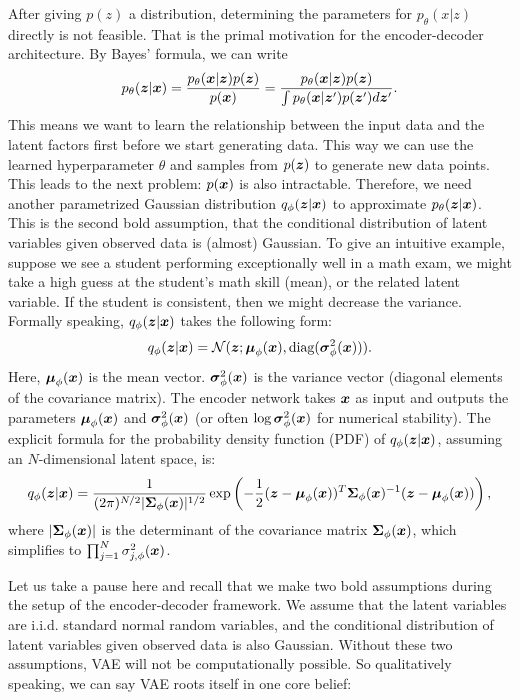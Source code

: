 After giving $p(z)$ a distribution, determining the parameters for
$p_{\theta}(x|z)$ directly is not feasible. That is the primal motivation for
the encoder-decoder architecture. By Bayes' formula, we can write
\begin{align}
    p_{\theta}(\boldsymbol{z}|\boldsymbol{x}) = \frac{p_{\theta}(\boldsymbol{x}|\boldsymbol{z}) p(\boldsymbol{z})}{p(\boldsymbol{x})} = \frac{p_{\theta}(\boldsymbol{x}|\boldsymbol{z}) p(\boldsymbol{z})}{\int p_{\theta}(\boldsymbol{x}|\boldsymbol{z}') p(\boldsymbol{z}') d\boldsymbol{z}'}.
\end{align}
This means we want to learn the relationship between the input data and the latent factors first before we start generating data. This way we can use the learned hyperparameter $\theta$ and samples from $p(\boldsymbol{z})$ to generate new data points. This leads to the next problem: $p(\boldsymbol{x})$ is also intractable. Therefore, we need another parametrized Gaussian distribution $q_{\phi}(\boldsymbol{z}|\boldsymbol{x})$ to approximate $p_{\theta}(\boldsymbol{z}|\boldsymbol{x})$. This is the second bold assumption, that the conditional distribution of latent variables given observed data is (almost) Gaussian. To give an intuitive example, suppose we see a student performing exceptionally well in a math exam, we might take a high guess at the student's math skill (mean), or the related latent variable. If the student is consistent, then we might decrease the variance. Formally speaking, $q_{\phi}(\boldsymbol{z}|\boldsymbol{x})$ takes the following form:
\begin{align}
    q_{\phi}(\boldsymbol{z}|\boldsymbol{x}) = \mathcal{N}(\boldsymbol{z}; \boldsymbol{\mu}_{\phi}(\boldsymbol{x}), \text{diag}(\boldsymbol{\sigma}^2_{\phi}(\boldsymbol{x}))).
\end{align}
Here, $\boldsymbol{\mu}_{\phi}(\boldsymbol{x})$ is the mean vector. $\boldsymbol{\sigma}^2_{\phi}(\boldsymbol{x})$ is the variance vector (diagonal elements of the covariance matrix).
The encoder network takes $\boldsymbol{x}$ as input and outputs the parameters $\boldsymbol{\mu}_{\phi}(\boldsymbol{x})$ and $\boldsymbol{\sigma}^2_{\phi}(\boldsymbol{x})$ (or often $\log \boldsymbol{\sigma}^2_{\phi}(\boldsymbol{x})$ for numerical stability). The explicit formula for the probability density function (PDF) of $q_{\phi}(\boldsymbol{z}|\boldsymbol{x})$, assuming an $N$-dimensional latent space, is:
\begin{align}
    q_{\phi}(\boldsymbol{z}|\boldsymbol{x}) = \frac{1}{(2\pi)^{N/2} |\boldsymbol{\Sigma}_{\phi}(\boldsymbol{x})|^{1/2}} \exp\left(-\frac{1}{2} (\boldsymbol{z} - \boldsymbol{\mu}_{\phi}(\boldsymbol{x}))^T \boldsymbol{\Sigma}_{\phi}(\boldsymbol{x})^{-1} (\boldsymbol{z} - \boldsymbol{\mu}_{\phi}(\boldsymbol{x}))\right),
\end{align}
where $|\boldsymbol{\Sigma}_{\phi}(\boldsymbol{x})|$ is the determinant of the covariance matrix $\boldsymbol{\Sigma}_{\phi}(\boldsymbol{x})$, which simplifies to $\prod_{j=1}^{N} \sigma_{j, \phi}^2(\boldsymbol{x})$.

Let us take a pause here and recall that we make two bold assumptions during
the setup of the encoder-decoder framework. We assume that the latent variables
are i.i.d. standard normal random variables, and the conditional distribution
of latent variables given observed data is also Gaussian. Without these two
assumptions, VAE will not be computationally possible. So qualitatively
speaking, we can say VAE roots itself in one core belief:

